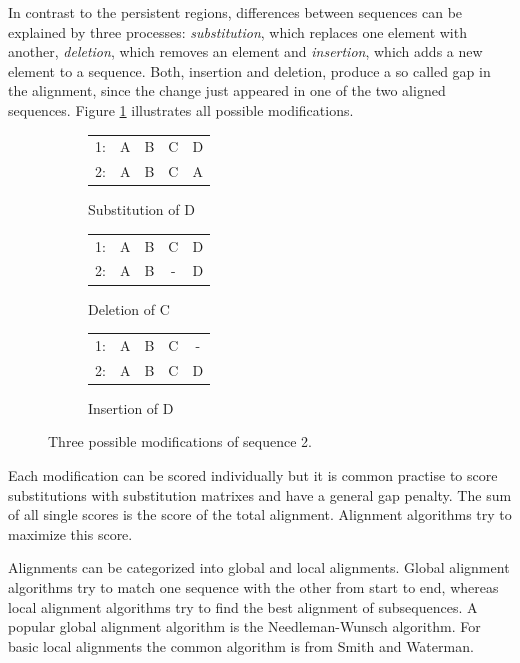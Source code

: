 In contrast to the persistent regions, differences between sequences can be explained by three processes: \textit{substitution}, which replaces one element with another,  \textit{deletion}, which removes an element and \textit{insertion}, which adds a new element to a sequence.
Both, insertion and deletion, produce a so called gap in the alignment, since the change just appeared in one of the two aligned sequences. 
Figure \ref{fig:alignmentbasic} illustrates all possible modifications.
\begin{figure}[h]
	\centering
	\begin{subfigure}[b]{0.3\textwidth}
	\begin{tabular}{c|cccc}
		1: &A&B&C&D\\
		2: &A&B&C&A\\
	\end{tabular}
	\caption{Substitution of D}
	\end{subfigure}
	\begin{subfigure}[b]{0.3\textwidth}
	\begin{tabular}{c|cccc}
		1:&A&B&C&D\\
		2:&A&B&-&D\\
	\end{tabular}
	\caption{Deletion of C}
	\end{subfigure}
	\begin{subfigure}[b]{0.3\textwidth}
	\begin{tabular}{c|cccc}
		1:&A&B&C&-\\
		2:&A&B&C&D\\
	\end{tabular}
	\caption{Insertion of D}
	\end{subfigure}
	\caption{Three possible modifications of sequence 2.}
	\label{fig:alignmentbasic}
\end{figure}
Each modification can be scored individually but it is common practise to score substitutions with substitution matrixes and have a general gap penalty. The sum of all single scores is the score of the total alignment.
Alignment algorithms try to maximize this score.


Alignments can be categorized into global and local alignments. Global alignment algorithms try to match one sequence with the other from start to end, whereas local alignment algorithms try to find the best alignment of subsequences.
A popular global alignment algorithm is the Needleman-Wunsch algorithm\cite{needleman1970}. For basic local alignments the common algorithm is from Smith and Waterman\cite{waterman1981}.
